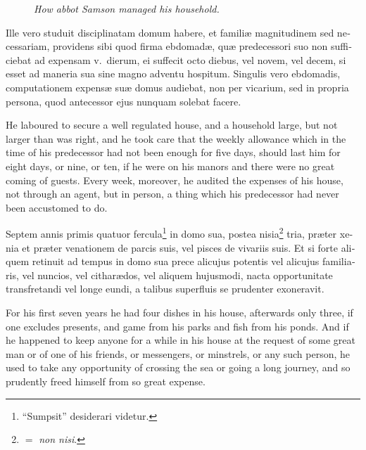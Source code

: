 \documentclass{book}
\newcommand{\blockhead}[4][]{
\begin{figure}
\centering
\vspace{#4}
\parbox{2.75cm}{\begin{center}\footnotesize \color{BrickRed} \emph{#2}\\ #1 \end{center}}
\end{figure}
}
\begin{document}
\begin{paracol}{2}
\switchcolumn*

\begin{otherlanguage}{latin}
\blockhead{How abbot Samson managed his household.}{3}{-0.55cm}
Ille vero studuit disciplinatam domum habere, et famili\ae{} magnitudinem sed necessariam, providens sibi quod firma ebdomad\ae{}, qu\ae{} predecessori suo non sufficiebat ad expensam v.\ dierum, ei suffecit octo diebus, vel novem, vel decem, si esset ad maneria sua sine magno adventu hospitum. Singulis vero ebdomadis, computationem expens\ae{} su\ae{} domus audiebat, non per vicarium, sed in propria persona, quod antecessor ejus nunquam solebat facere.

\end{otherlanguage}

\switchcolumn

He laboured to secure a well regulated house, and a household large, but not larger than was right, and he took care that the weekly allowance which in the time of his predecessor had not been enough for five days, should last him for eight days, or nine, or ten, if he were on his manors and there were no great coming of guests. Every week, moreover, he audited the expenses of his house, not through an agent, but in person, a thing which his predecessor had never been accustomed to do.

\switchcolumn*

\begin{otherlanguage}{latin}
Septem annis primis quatuor fercula\footnote[\textdagger]{``Sumpsit'' desiderari videtur.} in domo sua, postea nisia\footnote[\ddag]{$=$ \emph{non nisi}.} tria, pr\ae{}ter xenia et pr\ae{}ter venationem de parcis suis, vel pisces de vivariis suis. Et si forte aliquem retinuit ad tempus in domo sua prece alicujus potentis vel alicujus familiaris, vel nuncios, vel cithar\ae{}dos, vel aliquem hujusmodi, nacta opportunitate transfretandi vel longe eundi, a talibus superfluis se prudenter exoneravit.
\end{otherlanguage}

\switchcolumn

For his first seven years he had four dishes in his house, afterwards only three, if one excludes presents, and game from his parks and fish from his ponds. And if he happened to keep anyone for a while in his house at the request of some great man or of one of his friends, or messengers, or minstrels, or any such person, he used to take any opportunity of crossing the sea or going a long journey, and so prudently freed himself from so great expense.


\end{paracol}
\end{document}
